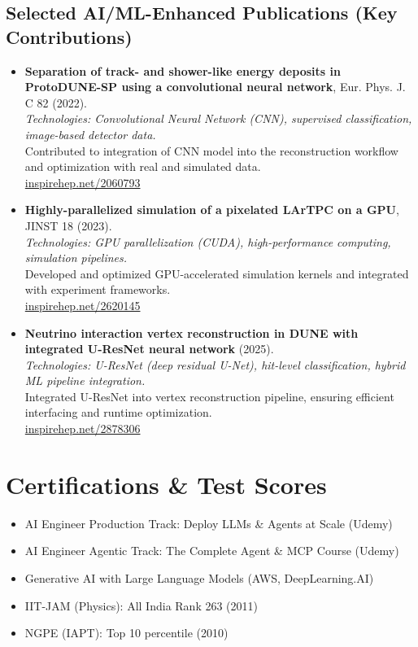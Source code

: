 \documentclass[a4paper,10pt]{article}
\begin{document}
\subsection*{Selected AI/ML-Enhanced Publications (Key Contributions)}
\begin{itemize}[leftmargin=0.5cm]
  \item \textbf{Separation of track- and shower-like energy deposits in ProtoDUNE-SP using a convolutional neural network}, Eur. Phys. J. C 82 (2022). \\
  \textit{Technologies: Convolutional Neural Network (CNN), supervised classification, image-based detector data.} \\
  Contributed to integration of CNN model into the reconstruction workflow and optimization with real and simulated data. \\
  \href{https://inspirehep.net/literature/2060793}{inspirehep.net/2060793}
  
  \item \textbf{Highly-parallelized simulation of a pixelated LArTPC on a GPU}, JINST 18 (2023). \\
  \textit{Technologies: GPU parallelization (CUDA), high-performance computing, simulation pipelines.} \\
  Developed and optimized GPU-accelerated simulation kernels and integrated with experiment frameworks. \\
  \href{https://inspirehep.net/literature/2620145}{inspirehep.net/2620145}
  
  \item \textbf{Neutrino interaction vertex reconstruction in DUNE with integrated U-ResNet neural network} (2025). \\
  \textit{Technologies: U-ResNet (deep residual U-Net), hit-level classification, hybrid ML pipeline integration.} \\
  Integrated U-ResNet into vertex reconstruction pipeline, ensuring efficient interfacing and runtime optimization. \\
  \href{https://inspirehep.net/literature/2878306}{inspirehep.net/2878306}
\end{itemize}


\section{Certifications \& Test Scores}
\begin{itemize}[leftmargin=0.5cm]
  \item AI Engineer Production Track: Deploy LLMs \& Agents at Scale (Udemy)
  \item AI Engineer Agentic Track: The Complete Agent \& MCP Course (Udemy)
  \item Generative AI with Large Language Models (AWS, DeepLearning.AI)
  \item IIT-JAM (Physics): All India Rank 263 (2011)
  \item NGPE (IAPT): Top 10 percentile (2010)
\end{itemize}
\end{document}
